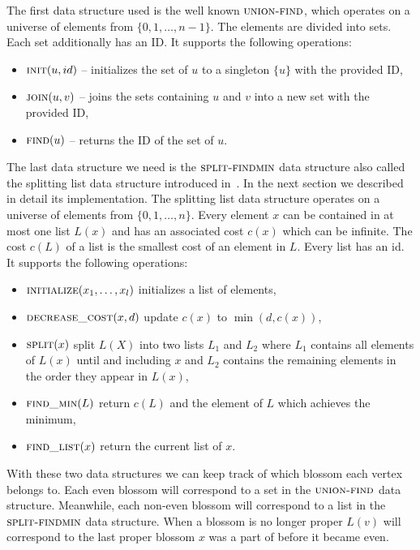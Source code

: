 The first data structure used is the well known $\textsc{union-find}$, which operates on a universe of elements from $\{ 0, 1, \dots, n-1 \}$. The elements are divided into sets. Each set additionally has an ID\@. It supports the following operations:

\begin{itemize}
    \item $\textsc{init}(u, id)$ – initializes the set of $u$ to a singleton $\{u\}$ with the provided ID,
    \item $\textsc{join}(u, v)$ – joins the sets containing $u$ and $v$ into a new set with the provided ID,
    \item $\textsc{find}(u)$ – returns the ID of the set of $u$.
\end{itemize}

The last data structure we need is the $\textsc{split-findmin}$ data structure also called the splitting list data structure introduced in~\cite{gabow1985scaling}. In the next section we described in detail its implementation. The splitting list data structure operates on a universe of elements from $\{0, 1, \dots, n\}$. Every element $x$ can be contained in at most one list $L(x)$ and has an associated cost $c(x)$ which can be infinite. The cost $c(L)$ of a list is the smallest cost of an element in $L$. Every list has an id. It supports the following operations:

\begin{itemize}
    \item $\textsc{initialize}(x_1, \dots, x_l)$ initializes a list of elements,
    \item $\textsc{decrease\_cost}(x, d)$ update $c(x)$ to $\min(d, c(x))$,
    \item $\textsc{split}(x)$ split $L(X)$ into two lists $L_1$ and $L_2$ where $L_1$ contains all elements of $L(x)$ until and including $x$ and $L_2$ contains the remaining elements in the order they appear in $L(x)$,
    \item $\textsc{find\_min}(L)$ return $c(L)$ and the element of $L$ which achieves the minimum,
    \item $\textsc{find\_list}(x)$ return the current list of $x$.
\end{itemize}

With these two data structures we can keep track of which blossom each vertex belongs to. Each even blossom will correspond to a set in the $\textsc{union-find}$ data structure. Meanwhile, each non-even blossom will correspond to a list in the $\textsc{split-findmin}$ data structure. When a blossom is no longer proper $L(v)$ will correspond to the last proper blossom $x$ was a part of before it became even.

